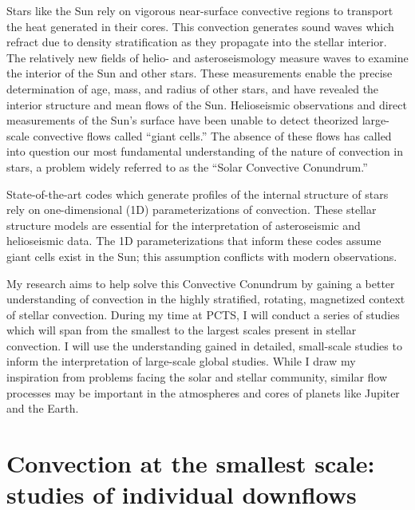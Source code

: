 \documentclass[11pt, preprint]{aastex}
\begin{document}
Stars like the Sun rely on vigorous near-surface convective regions to transport the heat generated in their cores.
This convection generates sound waves which refract due to density stratification as they propagate into the stellar interior.
The relatively new fields of helio- and asteroseismology measure waves to examine the interior of the Sun and other stars.
These measurements enable the precise determination of age, mass, and radius of other stars, and have revealed the interior structure and mean flows of the Sun.
Helioseismic observations and direct measurements of the Sun's surface have been unable to detect theorized large-scale convective flows called ``giant cells.''
The absence of these flows has called into question our most fundamental understanding of the nature of convection in stars, a problem widely referred to as the ``Solar Convective Conundrum.''

State-of-the-art codes which generate profiles of the internal structure of stars rely on one-dimensional (1D) parameterizations of convection.
These stellar structure models are essential for the interpretation of asteroseismic and helioseismic data.
The 1D parameterizations that inform these codes assume giant cells exist in the Sun; this assumption conflicts with modern observations.

My research aims to  help solve this Convective Conundrum by gaining a better understanding of convection in the highly stratified, rotating, magnetized context of stellar convection.
During my time at PCTS, I will conduct a series of studies which will span from the smallest to the largest scales present in stellar convection.
I will use the understanding gained in detailed, small-scale studies to inform the interpretation of large-scale global studies.
While I draw my inspiration from problems facing the solar and stellar community, similar flow processes may be important in the atmospheres and cores of planets like Jupiter and the Earth. 


\vspace{-20pt}
\section{Convection at the smallest scale: studies of individual downflows}
\vspace{-11pt}
\end{document}
